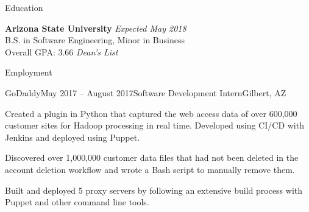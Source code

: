 \documentclass{resume} %
\begin{document}

\begin{rSection}{Education}

{\bf Arizona State University} \hfill {\em Expected May 2018} \\
B.S. in Software Engineering, Minor in Business \smallskip \\
Overall GPA: 3.66 \textit{Dean's List}

\end{rSection}


\begin{rSection}{Employment}

\begin{rSubsection}{GoDaddy}{May 2017 -- August 2017}{Software Development Intern}{Gilbert, AZ}
\item Created a plugin in Python that captured the web access data of over 600,000 customer sites for Hadoop processing in real time. Developed using CI/CD with Jenkins and deployed using Puppet.
\item Discovered over 1,000,000 customer data files that had not been deleted in the account deletion workflow and wrote a Bash script to manually remove them.
\item Built and deployed 5 proxy servers by following an extensive build process with Puppet and other command line tools.
\end{rSubsection}

\end{rSection}

\end{document}
